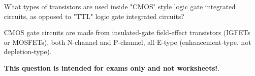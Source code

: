 

What types of transistors are used inside "CMOS" style logic gate integrated circuits, as opposed to "TTL" logic gate integrated circuits?







CMOS gate circuits are made from insulated-gate field-effect transistors (IGFETs or MOSFETs), both N-channel and P-channel, all E-type (enhancement-type, not depletion-type).







{\bf This question is intended for exams only and not worksheets!}.



